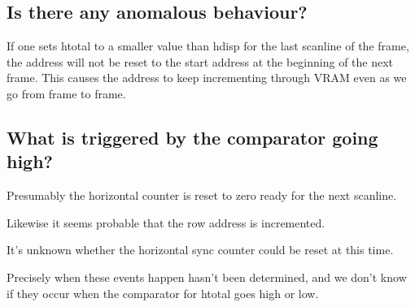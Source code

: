\documentclass[a4paper,10pt]{amsart}
\begin{document}
\subsection{Is there any anomalous behaviour?}

If one sets htotal to a smaller value than hdisp for the last scanline of the
frame, the address will not be reset to the start address at the beginning of
the next frame. This causes the address to keep incrementing through VRAM even
as we go from frame to frame.

\subsection{What is triggered by the comparator going high?}

Presumably the horizontal counter is reset to zero ready for the next scanline.

Likewise it seems probable that the row address is incremented.

It's unknown whether the horizontal sync counter could be reset at this time.

Precisely when these events happen hasn't been determined, and we don't know
if they occur when the comparator for htotal goes high or low.
\end{document}
